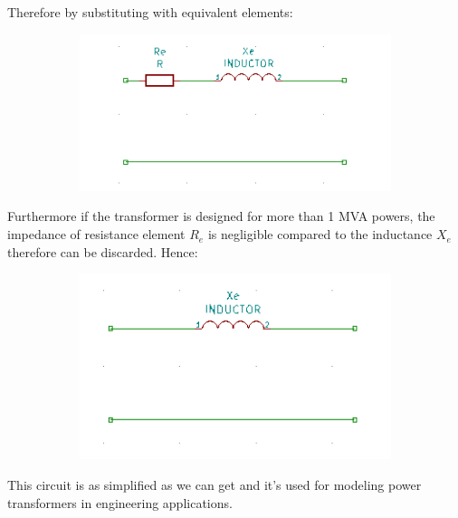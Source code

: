 \documentclass{article}
\begin{document}
	Therefore by substituting with equivalent elements:
	
	\begin{figure}[h!]
	\centering
	\begin{subfigure}[b]{0.6\linewidth}
		\includegraphics[width=\linewidth]{transformer_approx2.png}
	\end{subfigure}
	\end{figure}
	
	Furthermore if the transformer is designed for more than 1 MVA powers, the impedance of resistance element $R_e$ is negligible compared to the inductance $X_e$ therefore can be discarded. 
	Hence:
	
	\begin{figure}[h!]
	\centering
	\begin{subfigure}[b]{0.5\linewidth}
		\includegraphics[width=\linewidth]{transformer_approx3.png}
	\end{subfigure}
	\end{figure}
	
	This circuit is as simplified as we can get and it's used for modeling power transformers in engineering applications.
	
\end{document}

